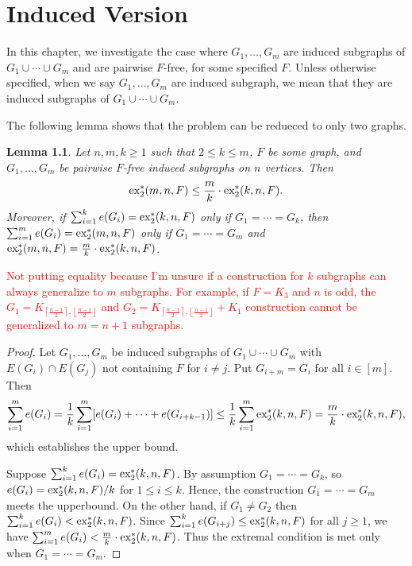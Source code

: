 \documentclass[12pt]{report}
\newtheorem{lemma}[theorem]{Lemma}
\newcommand*{\dex}{\textnormal{ex}_2}
\begin{document}
\chapter{Induced Version}

In this chapter, we investigate the case where $G_1, \ldots, G_m$ are induced subgraphs of $G_1 \cup \cdots \cup G_m$ and are pairwise $F$-free, for some specified $F$. Unless otherwise specified, when we say $G_1, \ldots, G_m$ are induced subgraph, we mean that they are induced subgraphs of $G_1 \cup \cdots \cup G_m$.

The following lemma shows that the problem can be redueced to only two graphs.

\begin{lemma}\label{lem:induce-reduce}
  Let $n, m, k \geq 1$ such that $2 \leq k \leq m$, $F$ be some graph, and $G_1, \ldots, G_m$ be pairwise $F$-free induced subgraphs on $n$ vertices. Then
  \[
    \dex^*(m, n, F) \leq \frac{m}{k} \cdot \dex^*(k, n, F).
  \]
  Moreover, if $\sum_{i = 1}^k e(G_i) = \dex^*(k, n, F)$ only if $G_1 = \cdots = G_k$, then $\sum_{i = 1}^m e(G_i) = \dex^*(m, n, F)$ only if $G_1 = \cdots = G_m$ and $\dex^*(m, n, F) = \frac{m}{k} \cdot \dex^*(k, n, F)$.
\end{lemma}

\textcolor{red}{Not putting equality because I'm unsure if a construction for $k$ subgraphs can always generalize to $m$ subgraphs. For example, if $F = K_3$ and $n$ is odd, the $G_1 = K_{\left\lceil\frac{n - 1}{2}\right\rceil, \left\lfloor\frac{n - 1}{2}\right\rfloor}$ and $G_2 = K_{\left\lceil\frac{n - 1}{2}\right\rceil, \left\lfloor\frac{n - 1}{2}\right\rfloor} + K_1$ construction cannot be generalized to $m = n + 1$ subgraphs.}

\begin{proof}
  Let $G_1, \ldots, G_m$ be induced subgraphs of $G_1 \cup \cdots \cup G_m$ with $E(G_i) \cap E(G_j)$ not containing $F$ for $i \neq j$. Put $G_{i + m} = G_i$ for all $i \in [m]$. Then
  \[
    \sum_{i = 1}^m e(G_i) = \frac{1}{k}\sum_{i = 1}^m [e(G_i) + \cdots + e(G_{i + k - 1})] \leq \frac{1}{k}\sum_{i = 1}^m \dex^*(k, n, F) = \frac{m}{k} \cdot \dex^*(k, n, F),
  \]
  which establishes the upper bound.

  Suppose $\sum_{i = 1}^k e(G_i) = \dex^*(k, n, F)$. By assumption $G_1 = \cdots = G_k$, so $e(G_i) = \dex^*(k, n, F)/k$ for $1 \leq i \leq k$. Hence, the construction $G_1 = \cdots = G_m$ meets the upperbound. On the other hand, if $G_1 \neq G_2$ then $\sum_{i = 1}^k e(G_i) < \dex^*(k, n, F)$. Since $\sum_{i = 1}^k e(G_{i + j}) \leq \dex^*(k, n, F)$ for all $j \geq 1$, we have $\sum_{i = 1}^m e(G_i) < \frac{m}{k} \cdot \dex^*(k, n, F)$. Thus the extremal condition is met only when $G_1 = \cdots = G_m$.
\end{proof}
\end{document}
